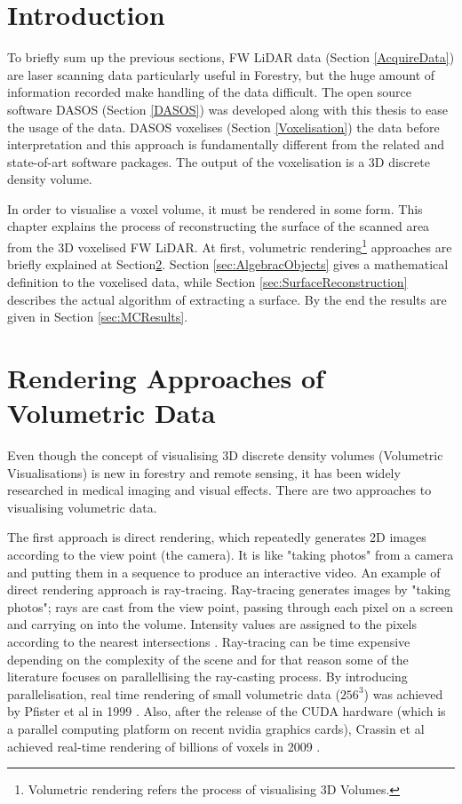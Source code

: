\documentclass{subfiles}
\begin{document}
	

\section{Introduction}


\par To briefly sum up the previous sections, FW LiDAR data (Section \ref{AcquireData}) are laser scanning data particularly useful in Forestry, but the huge amount of information recorded make handling of the data difficult. The open source software DASOS (Section \ref{DASOS}) was developed along with this thesis to ease the usage of the data. DASOS voxelises (Section \ref{Voxelisation}) the data before interpretation and this approach is fundamentally different from the related and state-of-art software packages. The output of the voxelisation is a 3D discrete density volume. 

\par In order to visualise a voxel volume, it must be rendered in some form.  This chapter explains the process of reconstructing the surface of the scanned area from the 3D voxelised FW LiDAR. At first, volumetric rendering\footnote{Volumetric rendering refers the process of visualising 3D Volumes.} approaches are briefly explained at Section\ref{sec:RenderingApproaches}. Section \ref{sec:AlgebracObjects} gives a mathematical definition to the voxelised data, while Section \ref{sec:SurfaceReconstruction} describes the actual algorithm of extracting a surface. By the end the results are given in Section \ref{sec:MCResults}. 


\section{Rendering Approaches of Volumetric Data}\label{sec:RenderingApproaches}
\par Even though the concept of visualising 3D discrete density volumes (Volumetric Visualisations) is new in forestry and remote sensing, it has been widely researched in medical imaging and visual effects. There are two approaches to visualising volumetric data.

\par The first approach is direct rendering, which repeatedly generates 2D images according to the view point (the camera). It is like "taking photos" from a camera and putting them in a sequence to produce an interactive video. An example of direct rendering approach is ray-tracing. Ray-tracing generates images by "taking photos"; rays are cast from the view point, passing through each pixel on a screen and carrying on into the volume.  Intensity values are assigned to the pixels according to the nearest intersections \cite{Hanrahan1983}. Ray-tracing can be time expensive depending on the complexity of the scene and for that reason some of the literature focuses on parallellising the ray-casting process. By introducing parallelisation, real time rendering of small volumetric data ($256^3$) was achieved by Pfister et al in 1999 \cite{Pfister1999}. Also, after the release of the CUDA hardware (which is a parallel computing platform on recent nvidia graphics cards), Crassin et al achieved real-time rendering of billions of voxels in 2009 \cite{Crassin2009}. 
	
\end{document}
